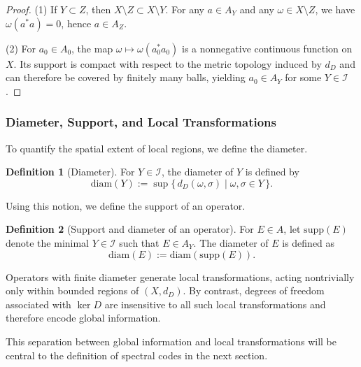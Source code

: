\documentclass[12pt]{article}
\theoremstyle{definition} %
\newtheorem{definition}{Definition}
\theoremstyle{plain} %
\theoremstyle{remark} %
\theoremstyle{underline}
\begin{document}
\begin{proof}
    (1) If $Y\subset Z$, then $X\setminus Z\subset X\setminus Y$. For any $a\in A_Y$ and any $\omega\in X\setminus Z$, we have $\omega(a^*a)=0$, hence $a\in A_Z$.
    
    (2) For $a_0\in A_0$, the map $\omega\mapsto \omega(a_0^*a_0)$ is a nonnegative continuous function on $X$. Its support is compact with respect to the metric topology induced by $d_D$ and can therefore be covered by finitely many balls, yielding $a_0\in A_Y$ for some $Y\in\mathcal{I}$.
\end{proof}

\subsubsection{Diameter, Support, and Local Transformations}

To quantify the spatial extent of local regions, we define the diameter.

\begin{definition}[Diameter]
    For $Y\in\mathcal{I}$, the diameter of $Y$ is defined by
    \[
        \mathrm{diam}(Y)
        := \sup\{\, d_D(\omega,\sigma) \mid \omega,\sigma \in Y \,\}.
    \]
\end{definition}

Using this notion, we define the support of an operator.

\begin{definition}[Support and diameter of an operator]
    For $E\in A$, let $\mathrm{supp}(E)$ denote the minimal $Y\in\mathcal{I}$ such that $E\in A_Y$. The diameter of $E$ is defined as
    \[
        \mathrm{diam}(E):=\mathrm{diam}(\mathrm{supp}(E)).
    \]
\end{definition}

Operators with finite diameter generate local transformations, acting nontrivially only within bounded regions of $(X,d_D)$. By contrast, degrees of freedom associated with $\ker D$ are insensitive to all such local transformations and therefore encode global information.

This separation between global information and local transformations will be central to the definition of spectral codes in the next section.




\end{document}

